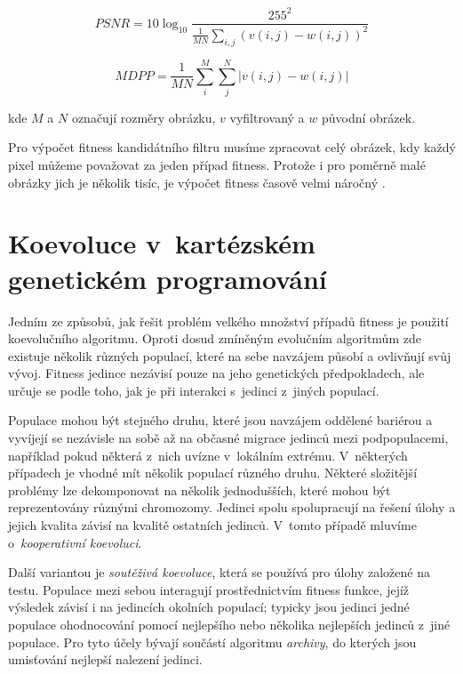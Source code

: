 \begin{equation}
    \label{eqPSNR}
    \mathit{PSNR} = 10 \log_{10} \frac{255^2}{\frac{1}{MN} \sum\limits_{i,j} \left( v\left( i, j \right) - w\left( i, j \right)  \right)^2 }
\end{equation}

\begin{equation}
    \label{eqMDPP}
    \mathit{MDPP} = \frac{1}{MN} \sum\limits_i^M \sum\limits_j^N \left| v\left( i, j \right) - w\left( i, j \right) \right|
\end{equation}

\noindent{}kde $M$ a $N$ označují rozměry obrázku, $v$ vyfiltrovaný a $w$ původní obrázek.

Pro výpočet fitness kandidátního filtru musíme zpracovat celý obrázek, kdy každý pixel můžeme považovat za jeden případ fitness. Protože i pro poměrně malé obrázky jich je několik tisíc, je výpočet fitness časově velmi náročný \cite{ZelenaIF, Modra}.

\section{Koevoluce v~kartézském genetickém programování}
\label{secCoev}

Jedním ze způsobů, jak řešit problém velkého množství případů fitness je použití koevolučního algoritmu. Oproti dosud zmíněným evolučním algoritmům zde existuje několik různých populací, které na sebe navzájem působí a ovlivňují svůj vývoj. Fitness jedince nezávisí pouze na jeho genetických předpokladech, ale určuje se podle toho, jak  je při interakci s~jedinci z~jiných populací.

Populace mohou být stejného druhu, které jsou navzájem oddělené bariérou a vyvíjejí se nezávisle na sobě až na občasné migrace jedinců mezi podpopulacemi, například pokud některá z~nich uvízne v~lokálním extrému. V~některých případech je vhodné mít několik populací různého druhu. Některé složitější problémy lze dekomponovat na několik jednodušších, které mohou být reprezentovány různými chromozomy. Jedinci spolu spolupracují na řešení úlohy a jejich kvalita závisí na kvalitě ostatních jedinců. V~tomto případě mluvíme o~\emph{kooperativní koevoluci}.

Další variantou je \emph{soutěživá koevoluce}, která se používá pro úlohy založené na testu. Populace mezi sebou interagují prostřednictvím fitness funkce, jejíž výsledek závisí i na jedincích okolních populací; typicky jsou jedinci jedné populace ohodnocování pomocí nejlepšího nebo několika nejlepších jedinců z~jiné populace. Pro tyto účely bývají součástí algoritmu \emph{archivy}, do kterých jsou umisťování nejlepší nalezení jedinci.

